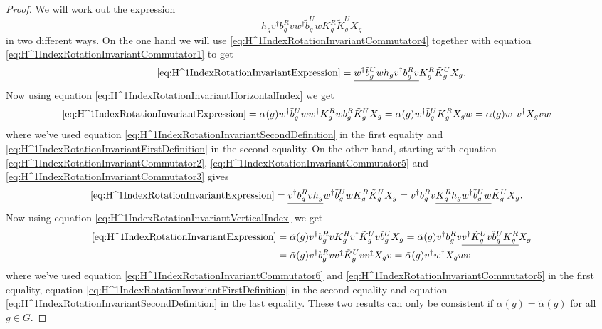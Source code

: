 \documentclass[11pt,a4paper,twoside]{article}
\numberwithin{equation}{section}
\begin{document}
	\begin{proof}
		We will work out the expression
		\begin{equation}\label{eq:H^1IndexRotationInvariantExpression}
			h_g v^\dagger b_g^R v w^\dagger\tilde{b}_g^U w K_g^R\tilde{K}_g^U X_g
		\end{equation}
		in two different ways. On the one hand we will use \eqref{eq:H^1IndexRotationInvariantCommutator4} together with equation \eqref{eq:H^1IndexRotationInvariantCommutator1} to get
		\begin{equation}
			\eqref{eq:H^1IndexRotationInvariantExpression}= \underline{w^\dagger\tilde{b}_g^U w h_g v^\dagger b_g^R v} K_g^R\tilde{K}_g^U X_g.
		\end{equation}
		Now using equation \eqref{eq:H^1IndexRotationInvariantHorizontalIndex} we get
		\begin{align}
			\eqref{eq:H^1IndexRotationInvariantExpression}&=\alpha(g)w^\dagger\tilde{b}_g^U w w^\dagger K_g^R w b_g^R\tilde{K}_g^U X_g=\alpha(g)w^\dagger\tilde{b}_g^U  K_g^R X_g w=\alpha(g)w^\dagger v^\dagger X_g v w
		\end{align}
		where we've used equation \eqref{eq:H^1IndexRotationInvariantSecondDefinition} in the first equality and \eqref{eq:H^1IndexRotationInvariantFirstDefinition} in the second equality. On the other hand, starting with equation \eqref{eq:H^1IndexRotationInvariantCommutator2}, \eqref{eq:H^1IndexRotationInvariantCommutator5} and \eqref{eq:H^1IndexRotationInvariantCommutator3} gives
		\begin{align}
			\eqref{eq:H^1IndexRotationInvariantExpression}&= \underline{v^\dagger b_g^R v h_g} w^\dagger\tilde{b}_g^U w K_g^R\tilde{K}_g^U X_g =v^\dagger b_g^R v \underline{K_g^R h_g w^\dagger\tilde{b}_g^U w} \tilde{K}_g^U X_g.
		\end{align}
		Now using equation \eqref{eq:H^1IndexRotationInvariantVerticalIndex} we get
		\begin{align}
			\eqref{eq:H^1IndexRotationInvariantExpression}&=\tilde{\alpha}(g)v^\dagger b_g^R v K_g^R v^\dagger \tilde{K}_g^U v \tilde{b}_g^U X_g=\tilde{\alpha}(g)v^\dagger b_g^R v \underline{v^\dagger \tilde{K}_g^U v \tilde{b}_g^U K_g^R} X_g\\
			&=\tilde{\alpha}(g)v^\dagger b_g^R \stkout{v v^\dagger} \tilde{K}_g^U \stkout{v v^\dagger} X_g v=\tilde{\alpha}(g) v^\dagger w^\dagger X_g w v
		\end{align}
		where we've used equation \eqref{eq:H^1IndexRotationInvariantCommutator6} and \eqref{eq:H^1IndexRotationInvariantCommutator5} in the first equality, equation \eqref{eq:H^1IndexRotationInvariantFirstDefinition} in the second equality and equation \eqref{eq:H^1IndexRotationInvariantSecondDefinition} in the last equality. These two results can only be consistent if $\alpha(g)=\tilde{\alpha}(g)$ for all $g\in G$.
	\end{proof}
\end{document}
